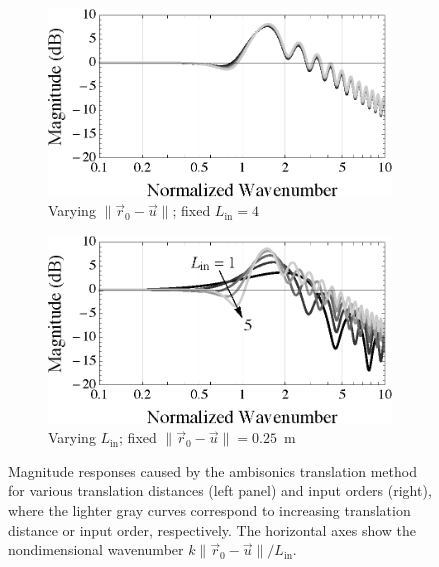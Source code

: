 \begin{figure}[t]
  \centering
  \begin{subfigure}[b]{0.49\textwidth}
    \includegraphics[width=\textwidth]{03_navigational_techniques/figures/nondimFreqResp_listenerPos_sre.eps}
    \caption{Varying $\| \vec{r}_0 - \vec{u} \|$; fixed $L_\text{in} = 4$}
    \label{fig:03_Navigation_Techniques:Nondim_SRE_RollOff:ListenerPos}
  \end{subfigure}
  \hfill
  \begin{subfigure}[b]{0.49\textwidth}
    \includegraphics[width=\textwidth]{03_navigational_techniques/figures/nondimFreqResp_inputOrders_sre.eps}
    \caption{Varying $L_\text{in}$; fixed $\| \vec{r}_0 - \vec{u} \| = 0.25$~m}
    \label{fig:03_Navigation_Techniques:Nondim_SRE_RollOff:InputOrders}
  \end{subfigure}
  \caption[Magnitude responses caused by the ambisonics translation method.]{
  Magnitude responses caused by the ambisonics translation method for various translation distances (left panel) and input orders (right), where the lighter gray curves correspond to increasing translation distance or input order, respectively.
  The horizontal axes show the nondimensional wavenumber $k \| \vec{r}_0 - \vec{u} \| / L_\text{in}$.}
  \label{fig:03_Navigation_Techniques:Nondim_SRE_RollOff}
\end{figure}

